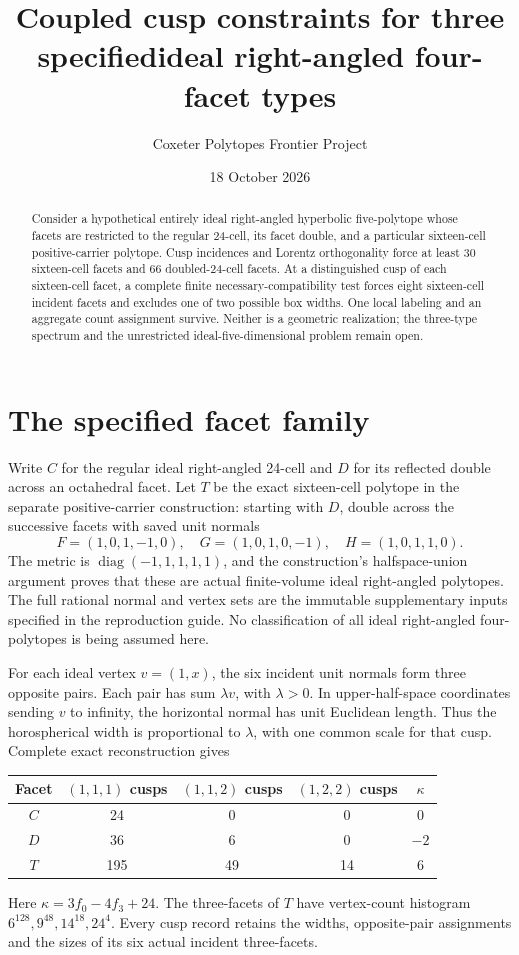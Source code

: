 \documentclass[11pt]{article}
\title{Coupled cusp constraints for three specified\linebreak ideal right-angled four-facet types}
\author{Coxeter Polytopes Frontier Project}
\date{18 October 2026}
\begin{document}
\maketitle
\begin{abstract}
Consider a hypothetical entirely ideal right-angled hyperbolic
five-polytope whose facets are restricted to the regular 24-cell,
its facet double, and a particular sixteen-cell positive-carrier
polytope. Cusp incidences and Lorentz orthogonality force at least
30 sixteen-cell facets and 66 doubled-24-cell facets. At a distinguished
cusp of each sixteen-cell facet, a complete finite necessary-compatibility
test forces eight sixteen-cell incident facets and excludes one of two
possible box widths. One local labeling and an aggregate count assignment
survive. Neither is a geometric realization; the three-type spectrum
and the unrestricted ideal-five-dimensional problem remain open.
\end{abstract}

\section{The specified facet family}
Write $C$ for the regular ideal right-angled 24-cell and $D$ for its
reflected double across an octahedral facet. Let $T$ be the exact
sixteen-cell polytope in the separate positive-carrier construction:
starting with $D$, double across the successive facets with saved unit
normals
\[
 F=(1,0,1,-1,0),\quad G=(1,0,1,0,-1),\quad H=(1,0,1,1,0).
\]
The metric is $\operatorname{diag}(-1,1,1,1,1)$, and the construction's
halfspace-union argument proves that these are actual finite-volume
ideal right-angled polytopes. The full rational normal and vertex sets
are the immutable supplementary inputs specified in the reproduction
guide. No classification of all ideal right-angled four-polytopes is
being assumed here.

For each ideal vertex $v=(1,x)$, the six incident unit normals form
three opposite pairs. Each pair has sum $\lambda v$, with $\lambda>0$.
In upper-half-space coordinates sending $v$ to infinity, the horizontal
normal has unit Euclidean length. Thus the horospherical width is
proportional to $\lambda$, with one common scale for that cusp.
Complete exact reconstruction gives
\begin{center}
\begin{tabular}{ccccc}\toprule
Facet&$(1,1,1)$ cusps&$(1,1,2)$ cusps&$(1,2,2)$ cusps&$\kappa$\\\midrule
$C$&24&0&0&0\\
$D$&36&6&0&$-2$\\
$T$&195&49&14&6\\\bottomrule
\end{tabular}
\end{center}
Here $\kappa=3f_0-4f_3+24$. The three-facets of $T$ have vertex-count
histogram $6^{128},9^{48},14^{18},24^4$. Every cusp record retains
the widths, opposite-pair assignments and the sizes of its six actual
incident three-facets.
\end{document}
